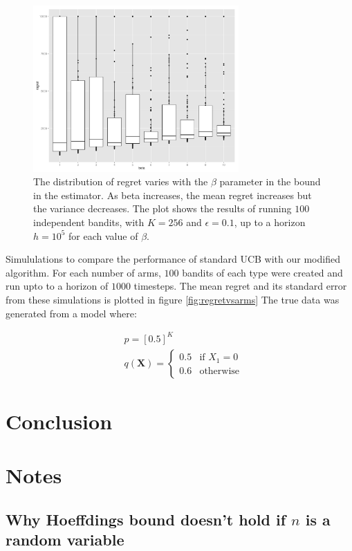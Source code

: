 \documentclass{article}
\newcommand{\eq}[1]{\begin{align*}#1\end{align*}}
\theoremstyle{plain}
\theoremstyle{definition}
\begin{document}
\begin{figure}[H]
\caption{The distribution of regret varies with the $\beta$ parameter in the bound in the estimator. As beta increases, the mean regret increases but the variance decreases. The plot shows the results of running $100$ independent bandits, with $K=256$ and $\epsilon=0.1$, up to a horizon $h=10^5$ for each value of $\beta$. }
\includegraphics[width=0.7\textwidth]{regret_vs_beta_boxplot.pdf}
\end{figure}



Simululations to compare the performance of standard UCB with our modified algorithm. For each number of arms, $100$ bandits of each type were created and run upto to a horizon of $1000$ timesteps. The mean regret and its standard error from these simulations is plotted in figure \ref{fig:regretvsarms} The true data was generated from a model where:

\eq{
&p = [0.5]^{K}\\
&q(\boldsymbol{X}) = \begin{cases}0.5 & \text{if $X_{1}=0$}\\ 0.6 & \text{otherwise} \end{cases}
}






\section{Conclusion}

\newpage
\section{Notes}

\subsection{Why Hoeffdings bound doesn't hold if $n$ is a random variable}
\end{document}
